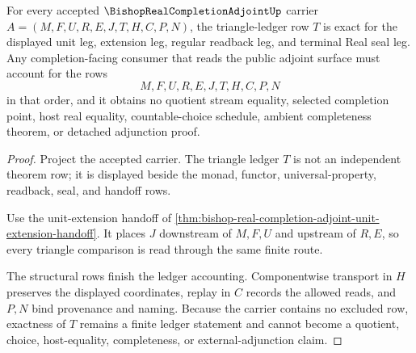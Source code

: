 \begin{theorem}
\label{thm:bishop-real-completion-adjoint-triangle-ledger-exactness}
For every accepted $\BishopRealCompletionAdjointUp$ carrier $A=(M,F,U,R,E,J,T,H,C,P,N)$, the triangle-ledger row $T$ is exact for the displayed unit leg, extension leg, regular readback leg, and terminal Real seal leg. Any completion-facing consumer that reads the public adjoint surface must account for the rows
$$
M,F,U,R,E,J,T,H,C,P,N
$$
in that order, and it obtains no quotient stream equality, selected completion point, host real equality, countable-choice schedule, ambient completeness theorem, or detached adjunction proof.
\end{theorem}
\begin{proof}
Project the accepted carrier. The triangle ledger $T$ is not an independent theorem row; it is displayed beside the monad, functor, universal-property, readback, seal, and handoff rows.

Use the unit-extension handoff of \autoref{thm:bishop-real-completion-adjoint-unit-extension-handoff}. It places $J$ downstream of $M,F,U$ and upstream of $R,E$, so every triangle comparison is read through the same finite route.

The structural rows finish the ledger accounting. Componentwise transport in $H$ preserves the displayed coordinates, replay in $C$ records the allowed reads, and $P,N$ bind provenance and naming. Because the carrier contains no excluded row, exactness of $T$ remains a finite ledger statement and cannot become a quotient, choice, host-equality, completeness, or external-adjunction claim.
\end{proof}

